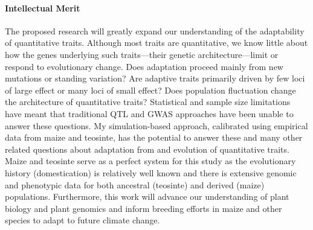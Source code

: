\paragraph{Intellectual Merit}  


The proposed research will greatly expand our understanding of the adaptability of quantitative traits. Although most traits are quantitative, we know little about how the genes underlying such traits---their genetic architecture---limit or respond to evolutionary change. Does adaptation proceed mainly from new mutations or standing variation? Are adaptive traits primarily driven by few loci of large effect or many loci of small effect? Does population fluctuation change the architecture of quantitative traits? Statistical and sample size limitations have meant that traditional QTL and GWAS approaches have been unable to answer these questions. My simulation-based approach, calibrated using empirical data from maize and teosinte, has the potential to answer these and many other related questions about adaptation from and evolution of quantitative traits. Maize and teosinte serve as a perfect system for this study as the evolutionary history (domestication) is relatively well known and there is extensive genomic and phenotypic data for both ancestral (teosinte) and derived (maize) populations. Furthermore, this work will advance our understanding of plant biology and plant genomics and inform breeding efforts in maize and other species to adapt to future climate change. 


